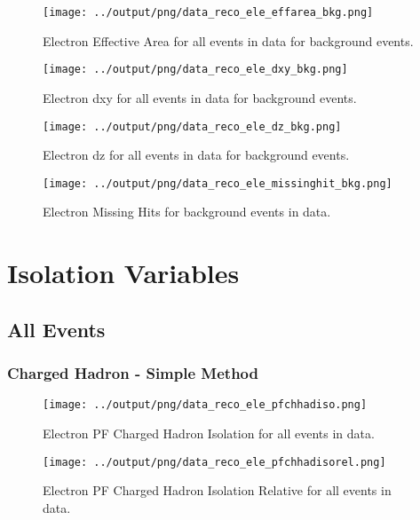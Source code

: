 \documentclass[11pt]{book}
\begin{document}
\begin{figure}[htb]
\centering
\texttt{[image: ../output/png/data\_reco\_ele\_effarea\_bkg.png]}
\caption{Electron Effective Area for all events in data for background events.}
\label{fig:data_ele_effarea_bkg}
\end{figure}

\begin{figure}[htb]
\centering
\texttt{[image: ../output/png/data\_reco\_ele\_dxy\_bkg.png]}
\caption{Electron dxy for all events in data for background events.}
\label{fig:data_ele_dxy_bkg}
\end{figure}

\begin{figure}[htb]
\centering
\texttt{[image: ../output/png/data\_reco\_ele\_dz\_bkg.png]}
\caption{Electron dz for all events in data for background events.}
\label{fig:data_ele_dz_bkg}
\end{figure}

\begin{figure}[htb]
\centering
\texttt{[image: ../output/png/data\_reco\_ele\_missinghit\_bkg.png]}
\caption{Electron Missing Hits for background events in data.}
\label{fig:data_ele_missinghĩt_bkg}
\end{figure}
\clearpage

\chapter{Isolation Variables}
\section{All Events}
\subsection{Charged Hadron - Simple Method}
\begin{figure}[htb]
\centering
\texttt{[image: ../output/png/data\_reco\_ele\_pfchhadiso.png]}
\caption{Electron PF Charged Hadron Isolation for all events in data.}
\label{fig:data_ele_pfchhadiso}
\end{figure}

\begin{figure}[htb]
\centering
\texttt{[image: ../output/png/data\_reco\_ele\_pfchhadisorel.png]}
\caption{Electron PF Charged Hadron Isolation Relative for all events in data.}
\label{fig:data_ele_pfchhadisorel}
\end{figure}
\end{document}
